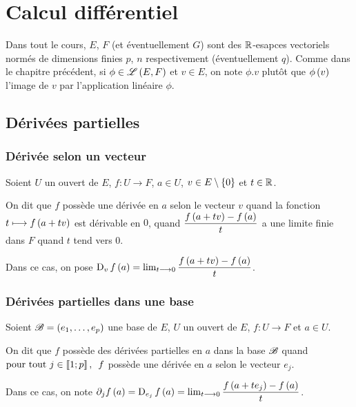 \chapter{Calcul différentiel}

\minitoc

Dans tout le cours, \(E\), \(F\) (et éventuellement \(G\)) sont des \(\mathbb{R}\)-esapces vectoriels normés de dimensions finies \(p\), \(n\) respectivement (éventuellement \(q\)). Comme dans le chapitre précédent, si \(\phi\in\mathscr{L}\left(E,F\right)\) et \(v\in E\), on note \(\phi.v\) plutôt que \(\phi\left(v\right)\) l'image de \(v\) par l'application linéaire \(\phi\).

\section{Dérivées partielles}

\subsection{Dérivée selon un vecteur}

\begin{defi}
Soient \(U\) un ouvert de \(E\), \(f:U\to F\), \(a\in U\), \(v\in E\setminus\left\lbrace0\right\rbrace\) et \(t\in\mathbb{R}\).

On dit que \(f\) possède une dérivée en \(a\) selon le vecteur \(v\) quand la fonction \(t\longmapsto f\left(a+tv\right)\) est dérivable en \(0\), \ie quand \(\dfrac{f\left(a+tv\right)-f\left(a\right)}{t}\) a une limite finie dans \(F\) quand \(t\) tend vers \(0\).

Dans ce cas, on pose \(\operatorname{D}_{v}f\left(a\right)=\lim_{t\longrightarrow0}\dfrac{f\left(a+tv\right)-f\left(a\right)}{t}\).
\end{defi}

\subsection{Dérivées partielles dans une base}

\begin{defi}
Soient \(\mathscr{B}=\left(e_1,\dots,e_p\right)\) une base de \(E\), \(U\) un ouvert de \(E\), \(f:U\to F\) et \(a\in U\).

On dit que \(f\) possède des dérivées partielles en \(a\) dans la base \(\mathscr{B}\) quand \(\quantifs{\tpt j\in\interventierii{1}{p}}f\) possède une dérivée en \(a\) selon le vecteur \(e_j\).

Dans ce cas, on note \(\pdif{j}f\paren{a}=\vdv{e_j}{f}\paren{a}=\lim_{t\to0}\dfrac{f\paren{a+te_j}-f\paren{a}}{t}\).
\end{defi}

